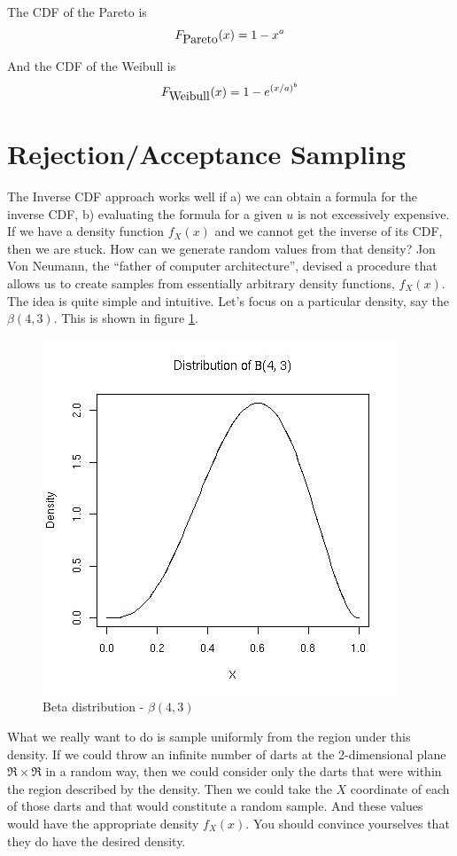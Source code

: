 \documentclass{article}
\begin{document}
The CDF of the Pareto is
\begin{equation}
  F_{\hbox{Pareto}}(x) = 1 - x^a
\end{equation}

And the CDF of the Weibull is
\begin{equation}
  F_{\hbox{Weibull}}(x) = 1 - e^{(x/a)^b}
\end{equation}



\section{Rejection/Acceptance Sampling}
The Inverse CDF approach works well if a) we can obtain a formula for
the inverse CDF, b) evaluating the formula for a given $u$ is not
excessively expensive.  If we have a density function $f_X(x)$ and we
cannot get the inverse of its CDF, then we are stuck.  How can we
generate random values from that density?  Jon Von Neumann, the
``father of computer architecture'', devised a procedure that allows
us to create samples from essentially arbitrary density functions,
$f_X(x)$.  The idea is quite simple and intuitive.  Let's focus on a
particular density, say the $\beta(4, 3)$.  This is
shown in figure \ref{fig:beta43}.
\begin{figure}[htbp]
  \begin{center}
    \leavevmode
    \includegraphics{beta43.jpg}
    \caption{Beta distribution - $\beta(4, 3)$}
    \label{fig:beta43}
  \end{center}
\end{figure}
What we really want to do is sample uniformly from the region under
this density.  If we could throw an infinite number of darts at the
2-dimensional plane $\Re \times \Re$ in a random way, then we could
consider only the darts that were within the region described by the
density.  Then we could take the $X$ coordinate of each of those darts
and that would constitute a random sample.  And these values would
have the appropriate density $f_X(x)$.  You should convince yourselves
that they do have the desired density.
\end{document}
